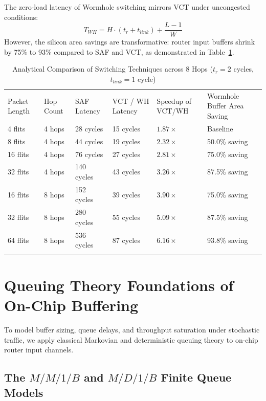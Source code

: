 The zero-load latency of Wormhole switching mirrors VCT under uncongested conditions:
\begin{equation}
T_{WH} = H \cdot (t_r + t_{link}) + \frac{L - 1}{W}
\label{eq:wh_latency}
\end{equation}
However, the silicon area savings are transformative: router input buffers shrink by 75\% to 93\% compared to SAF and VCT, as demonstrated in Table~\ref{tab:switching_comparison}.

\begin{table}[t]
\caption{Analytical Comparison of Switching Techniques across 8 Hops ($t_r = 2$ cycles, $t_{link} = 1$ cycle)}
\label{tab:switching_comparison}
\begin{tabular}{p{1.8cm}p{1.6cm}p{1.8cm}p{1.8cm}p{2.0cm}p{2.2cm}}
\hline\noalign{\smallskip}
Packet Length & Hop Count & SAF Latency & VCT / WH Latency & Speedup of VCT/WH & Wormhole Buffer Area Saving \\
\noalign{\smallskip}\svhline\noalign{\smallskip}
4 flits  & 4 hops & 28 cycles  & 15 cycles & $1.87\times$ & Baseline \\
8 flits  & 4 hops & 44 cycles  & 19 cycles & $2.32\times$ & 50.0\% saving \\
16 flits & 4 hops & 76 cycles  & 27 cycles & $2.81\times$ & 75.0\% saving \\
32 flits & 4 hops & 140 cycles & 43 cycles & $3.26\times$ & 87.5\% saving \\
16 flits & 8 hops & 152 cycles & 39 cycles & $3.90\times$ & 75.0\% saving \\
32 flits & 8 hops & 280 cycles & 55 cycles & $5.09\times$ & 87.5\% saving \\
64 flits & 8 hops & 536 cycles & 87 cycles & $6.16\times$ & 93.8\% saving \\
\noalign{\smallskip}\hline\noalign{\smallskip}
\end{tabular}
\end{table}

\section{Queuing Theory Foundations of On-Chip Buffering}
\label{sec:ch2_queuing_theory}

To model buffer sizing, queue delays, and throughput saturation under stochastic traffic, we apply classical Markovian and deterministic queuing theory to on-chip router input channels.

\subsection{The $M/M/1/B$ and $M/D/1/B$ Finite Queue Models}
\label{subsec:ch2_finite_queue}

